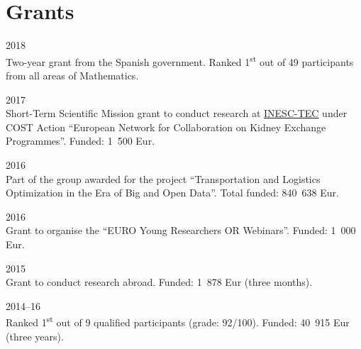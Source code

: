 \section*{Grants}

\begin{paracol}{2}
  \textsc{2018}
\switchcolumn
  \\
  Two-year grant from the Spanish government.
  Ranked 1\textsuperscript{st} out of 49 participants from all areas of Mathematics.
\end{paracol}

\begin{paracol}{2}
  \textsc{2017}
\switchcolumn
  \\
  Short-Term Scientific Mission grant to conduct research at \href{https://www.inesctec.pt/}{INESC-TEC} under COST Action ``European Network for Collaboration on Kidney Exchange Programmes''.
  Funded: 1~500 Eur.
\end{paracol}

\begin{paracol}{2}
  \textsc{2016}
\switchcolumn
  \\
  Part of the group awarded for the project ``Transportation and Logistics Optimization in the Era of Big and Open Data''.
  Total funded: 840~638 Eur.
\end{paracol}

\begin{paracol}{2}
  \textsc{2016}
\switchcolumn
  \\
  Grant to organise the ``EURO Young Researchers OR Webinars''.
  Funded: 1~000 Eur.
\end{paracol}

\begin{paracol}{2}
  \textsc{2015}
\switchcolumn
  \\
  Grant to conduct research abroad.
  Funded: 1~878 Eur (three months).
\end{paracol}

\begin{paracol}{2}
  \textsc{2014--16}
\switchcolumn
  \\
  Ranked 1\textsuperscript{st} out of 9 qualified participants (grade: 92/100).
  Funded: 40~915 Eur (three years).
\end{paracol}
